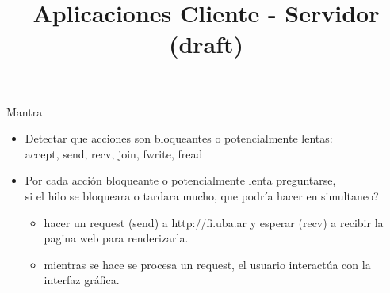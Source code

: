 

\title%
{Aplicaciones Cliente - Servidor (draft)}

\subject{Aplicaciones Cliente - Servidor (draft)}



%
%
%

\begin{frame}
   \titlepage
\end{frame}

\begin{frame}[fragile,label=M8]{Mantra}{}
   \begin{itemize}
      \item Detectar que acciones son bloqueantes o potencialmente lentas: \\
            accept, send, recv, join, fwrite, fread
      \item Por cada acci\'on bloqueante o potencialmente lenta preguntarse, \\
          si el hilo se bloqueara o tardara mucho, que podr\'ia hacer en simultaneo? 
       \begin{itemize}
           \item hacer un request (send) a http://fi.uba.ar y esperar (recv) a recibir la pagina web para renderizarla.
           \item mientras se hace se procesa un request, el usuario interact\'ua con la interfaz gr\'afica.
       \end{itemize}
   \end{itemize}
\end{frame}

